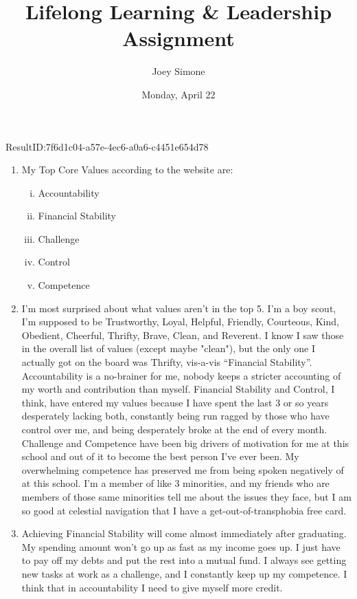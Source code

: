 \documentclass{article}[letterpaper,12pt]
\author{Joey Simone}
\title{Lifelong Learning \& Leadership Assignment}
\date{Monday, April 22}
\begin{document}
\maketitle
\begin{verbatim*}
	ResultID:7f6d1c04-a57e-4ec6-a0a6-c4451e654d78
\end{verbatim*}
\begin{enumerate}
	\item My Top Core Values according to the website are\parencite{noauthor_your_nodate}: 
		\begin{enumerate}[i.]
			\item Accountability
			\item Financial Stability
			\item Challenge
			\item Control
			\item Competence
		\end{enumerate}
	\item I'm most surprised about what values aren't in the top 5.
		I'm a boy scout, I'm supposed to be Trustworthy, Loyal, Helpful, Friendly, Courteous, Kind, Obedient, Cheerful, Thrifty, Brave, Clean, and Reverent.
		I know I saw those in the overall list of values (except maybe "clean"), but the only one I actually got on the board was Thrifty, vis-a-vis ``Financial Stability''.
		Accountability is a no-brainer for me, nobody keeps a stricter accounting of my worth and contribution than myself.
		Financial Stability and Control, I think, have entered my values because I have spent the last 3 or so years desperately lacking both, constantly being run ragged by those who have control over me, and being desperately broke at the end of every month.
		Challenge and Competence have been big drivers of motivation for me at this school and out of it to become the best person I've ever been.
		My overwhelming competence has preserved me from being spoken negatively of at this school.
		I'm a member of like 3 minorities, and my friends who are members of those same minorities tell me about the issues they face, but I am so good at celestial navigation that I have a get-out-of-transphobia free card.
	\item Achieving Financial Stability will come almost immediately after graduating.
	My spending amount won't go up as fast as my income goes up.
	I just have to pay off my debts and put the rest into a mutual fund.
	I always see getting new tasks at work as a challenge, and I constantly keep up my competence.
	I think that in accountability I need to give myself more credit.

\end{enumerate}
\end{document}
